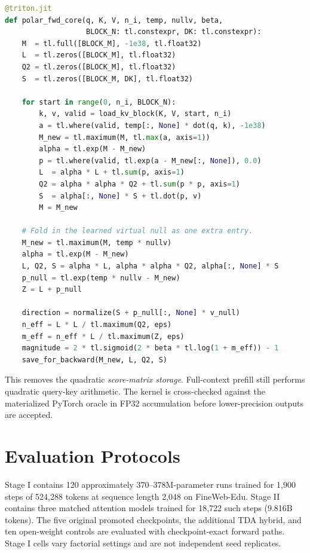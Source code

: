 \begin{lstlisting}[language=Python,caption={Schematic core of the block-streamed Triton forward pass.},label={lst:polar_triton}]
@triton.jit
def polar_fwd_core(q, K, V, n_i, temp, nullv, beta,
                   BLOCK_N: tl.constexpr, DK: tl.constexpr):
    M  = tl.full([BLOCK_M], -1e38, tl.float32)
    L  = tl.zeros([BLOCK_M], tl.float32)
    Q2 = tl.zeros([BLOCK_M], tl.float32)
    S  = tl.zeros([BLOCK_M, DK], tl.float32)

    for start in range(0, n_i, BLOCK_N):
        k, v, valid = load_kv_block(K, V, start, n_i)
        a = tl.where(valid, temp[:, None] * dot(q, k), -1e38)
        M_new = tl.maximum(M, tl.max(a, axis=1))
        alpha = tl.exp(M - M_new)
        p = tl.where(valid, tl.exp(a - M_new[:, None]), 0.0)
        L  = alpha * L + tl.sum(p, axis=1)
        Q2 = alpha * alpha * Q2 + tl.sum(p * p, axis=1)
        S  = alpha[:, None] * S + tl.dot(p, v)
        M = M_new

    # Fold in the learned virtual null as one extra entry.
    M_new = tl.maximum(M, temp * nullv)
    alpha = tl.exp(M - M_new)
    L, Q2, S = alpha * L, alpha * alpha * Q2, alpha[:, None] * S
    p_null = tl.exp(temp * nullv - M_new)
    Z = L + p_null

    direction = normalize(S + p_null[:, None] * v_null)
    n_eff = L * L / tl.maximum(Q2, eps)
    m_eff = n_eff * L / tl.maximum(Z, eps)
    magnitude = 2 * tl.sigmoid(2 * beta * tl.log(1 + m_eff)) - 1
    save_for_backward(M_new, L, Q2, S)
\end{lstlisting}

This removes the quadratic \emph{score-matrix storage}. Full-context prefill still performs quadratic query-key arithmetic. The kernel is cross-checked against the materialized PyTorch oracle in FP32 accumulation before lower-precision outputs are accepted.

\section{Evaluation Protocols}
\label{appendix:protocol}

Stage I contains 120 approximately 370--378M-parameter runs trained for 1,900 steps of 524,288 tokens at sequence length 2,048 on FineWeb-Edu. Stage II contains three matched attention models trained for 18,722 such steps (9.816B tokens). The five original promoted checkpoints, the additional TDA hybrid, and ten open-weight controls are evaluated with checkpoint-exact forward paths. Stage I cells vary factorial settings and are not independent seed replicates.

